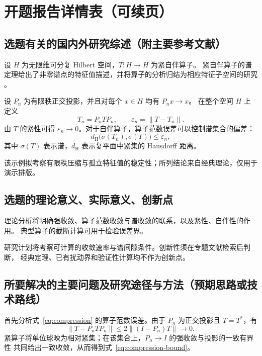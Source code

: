 \documentclass[fontset=fandol,bibliography]{fdu-proposal}
\begin{document}
\basicInformation
\supervisorComments
\chapter{开题报告详情表（可续页）}

\section{选题有关的国内外研究综述（附主要参考文献）}

设 $H$ 为无限维可分复 Hilbert 空间，$T\colon H\to H$ 为紧自伴算子。
紧自伴算子的谱定理给出了非零谱点的特征值描述，并将算子的分析归结为相应特征子空间的研究
\parencite{conway1990}。

设 $P_n$ 为有限秩正交投影，并且对每个 $x\in H$ 均有 $P_nx\to x$。
在整个空间 $H$ 上定义
\begin{equation}\label{eq:compression}
  T_n=P_nTP_n,\qquad \varepsilon_n=\lVert T-T_n\rVert.
\end{equation}
由 $T$ 的紧性可得 $\varepsilon_n\to0$。对于自伴算子，算子范数误差可以控制谱集合的偏差：
\[
  d_{\mathrm H}\bigl(\sigma(T_n),\sigma(T)\bigr)\leq\varepsilon_n,
\]
其中 $\sigma(T)$ 表示谱，$d_{\mathrm H}$ 表示复平面中紧集的 Hausdorff 距离。

该示例拟考察有限秩压缩与孤立特征值的稳定性；所列结论来自经典理论，仅用于演示排版。

\printbibliography

\section{选题的理论意义、实际意义、创新点}

理论分析将明确强收敛、算子范数收敛与谱收敛的联系，以及紧性、自伴性的作用。
典型算子的截断计算可用于检验误差界。

研究计划将考察可计算的收敛速率与谱间隙条件。创新性须在专题文献检索后判断，
经典定理、已有扰动界和验证性计算均不作为创新点。

\section{所要解决的主要问题及研究途径与方法（预期思路或技术路线）}

首先分析式~\eqref{eq:compression} 的算子范数误差。由于 $P_n$ 为正交投影且 $T=T^*$，有
\begin{equation}\label{eq:compression-bound}
  \lVert T-P_nTP_n\rVert
  \leq 2\lVert(I-P_n)T\rVert\longrightarrow0.
\end{equation}
紧算子将单位球映为相对紧集；在该集合上，$P_n\to I$ 的强收敛与投影的一致有界性
共同给出一致收敛，从而得到式~\eqref{eq:compression-bound}。
\end{document}
